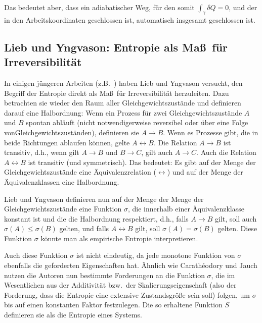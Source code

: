 Das bedeutet aber, dass ein adiabatischer Weg, f\"ur den somit $\int_{\gamma} \delta Q = 0$, und
der in den Arbeitskoordinaten geschlossen ist, automatisch insgesamt geschlossen ist. 


\subsection{Lieb und Yngvason: Entropie als Ma\ss\ f\"ur Irreversibilit\"at}

In einigen j\"ungeren Arbeiten (z.B.\ \cite{Lieb1,Lieb2}) haben Lieb und Yngvason versucht, den
Begriff der Entropie direkt als Ma\ss\ f\"ur Irreversibilit\"at herzuleiten. 
Dazu betrachten sie wieder den
Raum aller Gleichgewichtszust\"ande und definieren darauf eine Halbordnung: Wenn ein
Prozess f\"ur zwei Gleichgewichtszust\"ande $A$ und $B$ spontan abl\"auft (nicht notwendigerweise 
reversibel oder \"uber eine Folge vonGleichgewichtszust\"anden), definieren sie $A\rightarrow B$. 
Wenn es Prozesse gibt, die in beide Richtungen ablaufen k\"onnen, gelte $A \leftrightarrow B$.
Die Relation $A\rightarrow B$ ist transitiv, d.h., wenn gilt $A\rightarrow B$ und $B \rightarrow C$, gilt
auch $A \rightarrow C$. Auch die Relation $A \leftrightarrow B$ ist transitiv (und symmetrisch). 
Das bedeutet: Es gibt auf der Menge der Gleichgewichtszust\"ande eine \"Aquivalenzrelation
($\leftrightarrow$) und auf der Menge der \"Aquivalenzklassen eine Halbordnung. 

Lieb und Yngvason definieren nun auf der Menge der Menge der Gleichgewichtszust\"ande eine
Funktion $\sigma$, die innerhalb einer \"Aquivalenzklasse konstant ist und die die Halbordnung respektiert, 
d.h., falls $A \rightarrow B$ gilt, soll auch $\sigma(A) \leq \sigma(B)$ gelten, und falls $A \leftrightarrow B$
gilt, soll $\sigma(A) = \sigma(B)$ gelten. Diese Funktion $\sigma$ k\"onnte man als empirische
Entropie interpretieren. 

Auch diese Funktion $\sigma$ ist nicht eindeutig, da jede monotone Funktion von $\sigma$ ebenfalls
die geforderten Eigenschaften hat. \"Ahnlich wie Carath\'{e}odory und Jauch nutzen die Autoren nun
bestimmte Forderungen an die Funktion $\sigma$, die im Wesentlichen
aus der Additivit\"at bzw.\ der Skalierungseigenschaft (also der Forderung, dass die Entropie eine
extensive Zustandsgr\"o\ss e sein soll)
folgen, um $\sigma$ bis auf einen konstanten
Faktor festzulegen. Die so erhaltene Funktion $S$ definieren sie als die Entropie eines Systems. 

